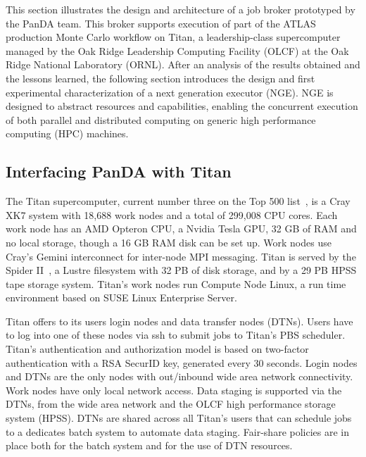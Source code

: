 This section illustrates the design and architecture of a job broker prototyped
by the PanDA team. This broker supports execution of part of the ATLAS
production Monte Carlo workflow on Titan, a leadership-class supercomputer
managed by the Oak Ridge Leadership Computing Facility (OLCF) at the Oak Ridge
National Laboratory (ORNL). After an analysis of the results obtained and the
lessons learned, the following section introduces the design and first
experimental characterization of a next generation executor (NGE). NGE is
designed to abstract resources and capabilities, enabling the concurrent
execution of both parallel and distributed computing on generic high performance
computing (HPC) machines.


\subsection{Interfacing PanDA with Titan}
\label{ssec:panda_titan}

The Titan supercomputer, current number three
on the Top 500 list~\cite{top500}, is a Cray XK7 system with 18,688 work nodes
and a total of 299,008 CPU cores. Each work node has an AMD Opteron CPU, a
Nvidia Tesla GPU, 32 GB of RAM and no local storage, though a 16 GB RAM disk can
be set up. Work nodes use Cray’s Gemini interconnect for inter-node MPI
messaging. Titan is served by the Spider II~\cite{spider2}, a Lustre filesystem
with 32 PB of disk storage, and by a 29 PB HPSS tape storage system. Titan’s
work nodes run Compute Node Linux, a run time environment based on SUSE Linux
Enterprise Server.


Titan offers to its users login nodes and data transfer nodes (DTNs). Users have
to log into one of these nodes via ssh to submit jobs to Titan's PBS scheduler.
Titan's authentication and authorization model is based on two-factor
authentication with a RSA SecurID key, generated every 30 seconds. Login nodes
and DTNs are the only nodes with out/inbound wide area network connectivity.
Work nodes have only local network access. Data staging is supported via the
DTNs, from the wide area network and the OLCF high performance storage system
(HPSS). DTNs are shared across all Titan's users that can schedule jobs to a
dedicates batch system to automate data staging. Fair-share policies are in
place both for the batch system and for the use of DTN resources.

